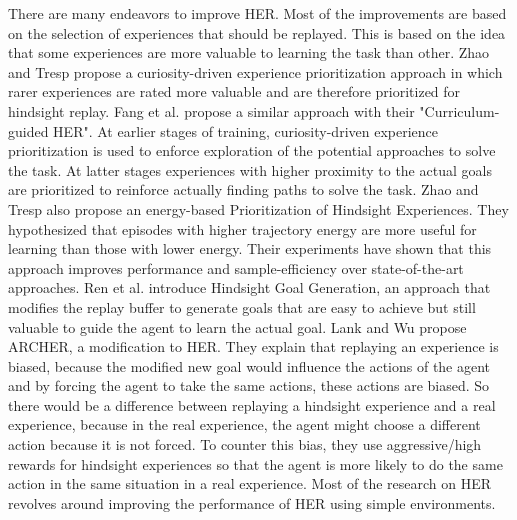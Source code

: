 There are many endeavors to improve HER. 
Most of the improvements are based on the selection of experiences that should be replayed. This is based on the idea that some experiences are more valuable to learning the task than other.
\newline
Zhao and Tresp propose a curiosity-driven experience prioritization approach in which rarer experiences are rated more valuable and are therefore prioritized for hindsight replay. \cite{curiousher}
\newline
Fang et al. propose a similar approach with their "Curriculum-guided HER". At earlier stages of training, curiosity-driven experience prioritization is used to enforce exploration of the potential approaches to solve the task. At latter stages experiences with higher proximity to the actual goals are prioritized to reinforce actually finding paths to solve the task. \cite{curricher}
\newline
Zhao and Tresp also propose an energy-based Prioritization of Hindsight Experiences. They hypothesized that episodes with higher trajectory energy are more useful for learning than those with lower energy. Their experiments have shown that this approach improves performance and sample-efficiency over state-of-the-art approaches. \cite{energyher}
\newline
Ren et al. introduce Hindsight Goal Generation, an approach that modifies the replay buffer to generate goals that are easy to achieve but still valuable to guide the agent to learn the actual goal. \cite{hgg}
\newline
Lank and Wu propose ARCHER, a modification to HER. They explain that replaying an experience is biased, because the modified new goal would influence the actions of the agent and by forcing the agent to take the same actions, these actions are biased. So there would be a difference between replaying a hindsight experience and a real experience, because in the real experience, the agent might choose a different action because it is not forced. To counter this bias, they use aggressive/high rewards for hindsight experiences so that the agent is more likely to do the same action in the same situation in a real experience. \cite{archer}
Most of the research on HER revolves around improving the performance of HER using simple environments.
\vspace{0.5cm}

